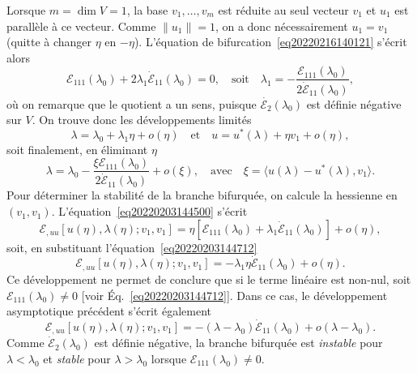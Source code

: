 \documentclass[12pt, final]{amsart}
\begin{document}
Lorsque $m = \dim V = 1$, la base $v_1, \ldots, v_m$ est réduite au seul
vecteur $v_1$ et $u_1$ est parall{\`e}le {\`a} ce vecteur. Comme $\lVert u_1
\rVert = 1$, on a donc nécessairement $u_1 = v_1$ (quitte {\`a} changer
$\eta$ en $- \eta$). L'équation de bifurcation~\eqref{eq20220216140121}
s'écrit alors
\begin{equation}
  \label{eq20220203144712} \mathcal{E}_{1  1  1} (\lambda_0) +
  2 \lambda_1  \dot{\mathcal{E}}_{1  1} (\lambda_0) = 0, \quad
  \text{soit} \quad \lambda_1 = - \frac{\mathcal{E}_{1  1  1}
  (\lambda_0)}{2 \dot{\mathcal{E}}_{1  1} (\lambda_0)},
\end{equation}
o{\`u} on remarque que le quotient a un sens, puisque $\dot{\mathcal{E}_2}
(\lambda_0)$ est définie négative sur $V$. On trouve donc les
développements limités
\begin{equation}
  \lambda = \lambda_0 + \lambda_1 \eta + o (\eta)  \quad \text{et} \quad u =
  u^{\ast} (\lambda) + \eta v_1 + o (\eta),
\end{equation}
soit finalement, en éliminant $\eta$
\begin{equation}
  \lambda = \lambda_0 - \frac{\xi \mathcal{E}_{1  1  1}
  (\lambda_0)}{2 \dot{\mathcal{E}}_{1  1} (\lambda_0)} + o (\xi),
  \quad \text{avec} \quad \xi = \langle u (\lambda) - u^{\ast} (\lambda), v_1
  \rangle .
\end{equation}
Pour déterminer la stabilité de la branche bifurquée, on calcule
la hessienne en $(v_1, v_1)$. L'équation~\eqref{eq20220203144500}
s'écrit
\begin{equation}
  \mathcal{E}_{, u  u} [u (\eta), \lambda (\eta) ; v_1, v_1] = \eta
  [\mathcal{E}_{1  1  1} (\lambda_0) + \lambda_1
  \dot{\mathcal{E}}_{1  1} (\lambda_0)] + o (\eta),
\end{equation}
soit, en substituant l'équation~\eqref{eq20220203144712}
\begin{equation}
  \mathcal{E}_{, u  u} [u (\eta), \lambda (\eta) ; v_1, v_1] = -
  \lambda_1 \eta \dot{\mathcal{E}}_{1  1} (\lambda_0) + o (\eta) .
\end{equation}
Ce développement ne permet de conclure que si le terme linéaire est
non-nul, soit $\mathcal{E}_{1  1  1} (\lambda_0) \neq 0$ [voir
Éq.~\eqref{eq20220203144712}]. Dans ce cas, le développement
asymptotique précédent s'écrit également
\begin{equation}
  \mathcal{E}_{, u  u} [u (\eta), \lambda (\eta) ; v_1, v_1] = -
  (\lambda - \lambda_0)  \dot{\mathcal{E}}_{1  1} (\lambda_0) + o
  (\lambda - \lambda_0) .
\end{equation}
Comme $\dot{\mathcal{E}}_2 (\lambda_0)$ est définie négative, la
branche bifurquée est \emph{instable} pour $\lambda < \lambda_0$ et
\emph{stable} pour $\lambda > \lambda_0$ lorsque $\mathcal{E}_{1  1
 1} (\lambda_0) \neq 0$.
\end{document}
